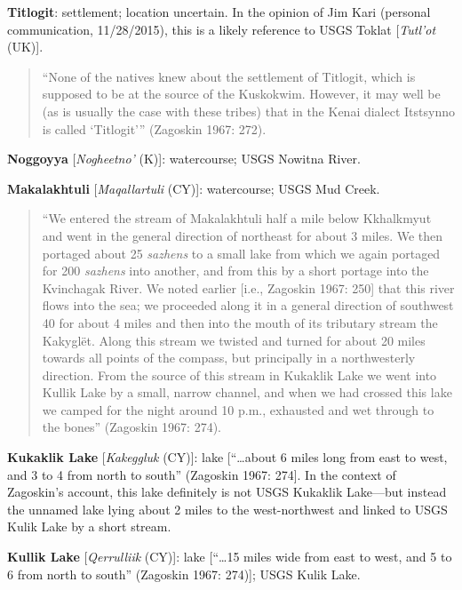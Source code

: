 \begin{hang}
\textbf{Titlogit}: settlement; location uncertain. In the opinion of Jim Kari (personal communication, 11/28/2015), this is a likely reference to USGS Toklat [\textit{Tutl’ot} (UK)].



\begin{quote}“None of the natives knew about the settlement of Titlogit, which is supposed to be at the source of the Kuskokwim. However, it may well be (as is usually the case with these tribes) that in the Kenai dialect Itstsynno is called ‘Titlogit’” (Zagoskin 1967: 272).
\end{quote}



\textbf{Noggoyya} [\textit{Nogheetno’} (K)]: watercourse; USGS Nowitna River.



\textbf{Makalakhtuli} [\textit{Maqallartuli }(CY)]: watercourse; USGS Mud Creek.



\begin{quote}“We entered the stream of Makalakhtuli half a mile below Kkhalkmyut and went in the general direction of northeast for about 3 miles. We then portaged about 25 \textit{sazhens} to a small lake from which we again portaged for 200 \textit{sazhens} into another, and from this by a short portage into the Kvinchagak River. We noted earlier [i.e., Zagoskin 1967: 250] that this river flows into the sea; we proceeded along it in a general direction of southwest 40 for about 4 miles and then into the mouth of its tributary stream the Kakyglët. Along this stream we twisted and turned for about 20 miles towards all points of the compass, but principally in a northwesterly direction. From the source of this stream in Kukaklik Lake we went into Kullik Lake by a small, narrow channel, and when we had crossed this lake we camped for the night around 10 p.m., exhausted and wet through to the bones” (Zagoskin 1967: 274).
\end{quote}



\textbf{Kukaklik Lake} [\textit{Kakeggluk }(CY)]: lake [“…about 6 miles long from east to west, and 3 to 4 from north to south” (Zagoskin 1967: 274]. In the context of Zagoskin’s account, this lake definitely is not USGS Kukaklik Lake—but instead the unnamed lake lying about 2 miles to the west-northwest and linked to USGS Kulik Lake by a short stream.



\textbf{Kullik Lake} [\textit{Qerrulliik} (CY)]: lake [“…15 miles wide from east to west, and 5 to 6 from north to south” (Zagoskin 1967: 274)]; USGS Kulik Lake.




\end{hang}

